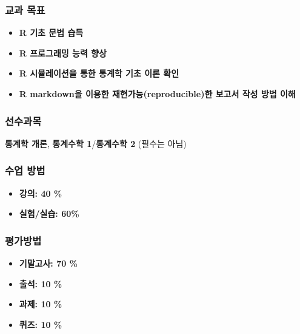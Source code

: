 \documentclass[
  11pt,
]{krantz}
\makeatletter
\providecommand{\tightlist}{%
  \setlength{\itemsep}{0pt}\setlength{\parskip}{0pt}}
\newenvironment{kframe}{%
\medskip{}
\setlength{\fboxsep}{.8em}
 \def\at@end@of@kframe{}%
 \ifinner\ifhmode%
  \def\at@end@of@kframe{\end{minipage}}%
  \begin{minipage}{\columnwidth}%
 \fi\fi%
 \def\FrameCommand##1{\hskip\@totalleftmargin \hskip-\fboxsep
 \colorbox{shadecolor}{##1}\hskip-\fboxsep
     \hskip-\linewidth \hskip-\@totalleftmargin \hskip\columnwidth}%
 \MakeFramed {\advance\hsize-\width
   \@totalleftmargin\z@ \linewidth\hsize
   \@setminipage}}%
 {\par\unskip\endMakeFramed%
 \at@end@of@kframe}
\renewenvironment{quote}{\begin{kframe}}{\end{kframe}}
\makeatother
\begin{document}
\hypertarget{purpose-course}{%
\subsubsection*{교과 목표}\label{purpose-course}}


\begin{quote}
\begin{itemize}
\tightlist
\item
  \textbf{R 기초 문법 습득}
\item
  \textbf{R 프로그래밍 능력 향상}
\item
  \textbf{R 시뮬레이션을 통한 통계학 기초 이론 확인}
\item
  \textbf{R markdown을 이용한 재현가능(reproducible)한 보고서 작성 방법 이해}
\end{itemize}
\end{quote}

\hypertarget{pre-course}{%
\subsubsection*{선수과목}\label{pre-course}}


\begin{quote}
\textbf{통계학 개론}, \textbf{통계수학 1}/\textbf{통계수학 2} (필수는 아님)
\end{quote}

\hypertarget{course-method}{%
\subsubsection*{수업 방법}\label{course-method}}


\begin{itemize}
\tightlist
\item
  \textbf{강의: 40 \%}
\item
  \textbf{실험/실습: 60\%}
\end{itemize}

\hypertarget{grade-method}{%
\subsubsection*{평가방법}\label{grade-method}}


\begin{quote}
\begin{itemize}
\tightlist
\item
  \textbf{기말고사: 70 \%}
\item
  \textbf{출석: 10 \%}
\item
  \textbf{과제: 10 \%}
\item
  \textbf{퀴즈: 10 \%}
\end{itemize}
\end{quote}
\end{document}
